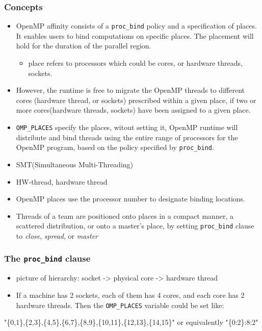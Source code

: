 \documentclass[11pt]{article}
\begin{document}
\subsubsection{Concepts}
\label{sec-9-6-1}
\begin{itemize}
\item OpenMP affinity consists of a \texttt{proc\_bind} policy and a specification of places. It enables users to bind computations on specific places. The placement will hold for the duration of the parallel region.
\begin{itemize}
\item place refers to processors which could be cores, or hardware threads, sockets.
\end{itemize}
\item However, the runtime is free to migrate the OpenMP threads to different cores (hardware thread, or sockets) prescribed within a given place, if two or more cores(hardware threads, sockets) have been assigned to a given place.
\item \texttt{OMP\_PLACES} specify the places, witout setting it, OpenMP runtime will distribute and bind threads using the entire range of processors for the OpenMP program, based on the policy specified by \texttt{proc\_bind}.
\item SMT(Simultaneous Multi-Threading)
\item HW-thread, hardware thread
\item OpenMP places use the processor number to designate binding locations.
\item Threads of a team are positioned onto places in a compact manner, a scattered distribution, or onto a master's place, by setting \texttt{proc\_bind} clause to \emph{close}, \emph{spread}, or \emph{master}
\end{itemize}
\subsubsection{The \texttt{proc\_bind} clause}
\label{sec-9-6-2}
\begin{itemize}
\item picture of hierarchy: socket -> physical core -> hardware thread
\item If a machine has 2 sockets, each of them has 4 cores, and each core has 2 hardware  threads. Then the \texttt{OMP\_PLACES} variable could be set like:
\end{itemize}
"\{0,1\},\{2,3\},\{4,5\},\{6,7\},\{8,9\},\{10,11\},\{12,13\},\{14,15\}" or equivalently "\{0:2\}:8:2"
\end{document}
